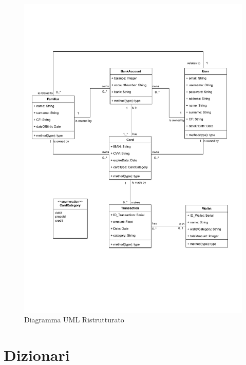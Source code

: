 \begin{figure}[!h]
    \centering
    \includegraphics[scale=0.7]{pdfs/RestructuredUMLdiagram.drawio.pdf}
    \caption{Diagramma UML Ristrutturato}\label{ResUML}
\end{figure}

\newpage
\section{Dizionari}

